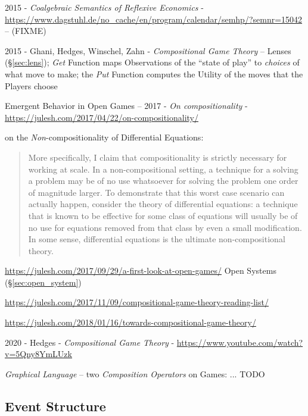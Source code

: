 2015 - \emph{Coalgebraic Semantics of Reflexive Economics} -
\url{https://www.dagstuhl.de/no_cache/en/program/calendar/semhp/?semnr=15042} --
(FIXME)

2015 - Ghani, Hedges, Winschel, Zahn - \emph{Compositional Game Theory}
-- Lenses (\S\ref{sec:lens}); \emph{Get} Function maps Observations of the
``state of play'' to \emph{choices} of what move to make; the \emph{Put}
Function computes the Utility of the moves that the Players choose

Emergent Behavior in Open Games --
2017 - \emph{On compositionality} -
\url{https://julesh.com/2017/04/22/on-compositionality/}

on the \emph{Non}-compositionality of Differential Equations:
\begin{quote}
  More specifically, I claim that compositionality is strictly necessary
  for working at scale. In a non-compositional setting, a technique for a
  solving a problem may be of no use whatsoever for solving the problem one
  order of magnitude larger. To demonstrate that this worst case scenario can
  actually happen, consider the theory of differential equations: a technique
  that is known to be effective for some class of equations will usually be of
  no use for equations removed from that class by even a small modification. In
  some sense, differential equations is the ultimate non-compositional theory.
\end{quote}

\url{https://julesh.com/2017/09/29/a-first-look-at-open-games/} \fist Open
Systems (\S\ref{sec:open_system})

\url{https://julesh.com/2017/11/09/compositional-game-theory-reading-list/}


\url{https://julesh.com/2018/01/16/towards-compositional-game-theory/}

\asterism

2020 - Hedges - \emph{Compositional Game Theory} -
\url{https://www.youtube.com/watch?v=5Qny8YmLUzk}

\emph{Graphical Language} -- two \emph{Composition Operators} on Games: ... TODO



\subsection{Event Structure}\label{sec:event_structure}

